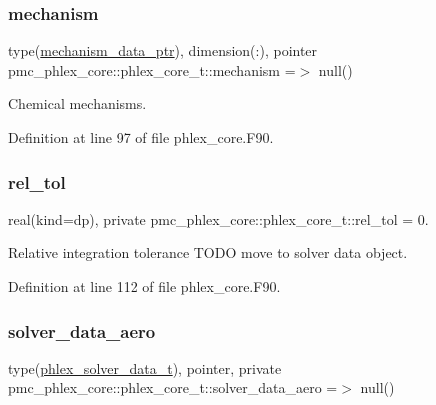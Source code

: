 \subsubsection{\texorpdfstring{mechanism}{mechanism}}
{\footnotesize\ttfamily type(\mbox{\hyperlink{structpmc__mechanism__data_1_1mechanism__data__ptr}{mechanism\+\_\+data\+\_\+ptr}}), dimension(\+:), pointer pmc\+\_\+phlex\+\_\+core\+::phlex\+\_\+core\+\_\+t\+::mechanism =$>$ null()\hspace{0.3cm}{\ttfamily [private]}}



Chemical mechanisms. 



Definition at line 97 of file phlex\+\_\+core.\+F90.

\mbox{\label{structpmc__phlex__core_1_1phlex__core__t_ad32a01219466ea95cf1db2633f017348}} 
\subsubsection{\texorpdfstring{rel\+\_\+tol}{rel\_tol}}
{\footnotesize\ttfamily real(kind=dp), private pmc\+\_\+phlex\+\_\+core\+::phlex\+\_\+core\+\_\+t\+::rel\+\_\+tol = 0.\hspace{0.3cm}{\ttfamily [private]}}



Relative integration tolerance T\+O\+DO move to solver data object. 



Definition at line 112 of file phlex\+\_\+core.\+F90.

\mbox{\label{structpmc__phlex__core_1_1phlex__core__t_a286ab62eaedfa66082c6817890ecb2f0}} 
\subsubsection{\texorpdfstring{solver\+\_\+data\+\_\+aero}{solver\_data\_aero}}
{\footnotesize\ttfamily type(\mbox{\hyperlink{structpmc__phlex__solver__data_1_1phlex__solver__data__t}{phlex\+\_\+solver\+\_\+data\+\_\+t}}), pointer, private pmc\+\_\+phlex\+\_\+core\+::phlex\+\_\+core\+\_\+t\+::solver\+\_\+data\+\_\+aero =$>$ null()\hspace{0.3cm}{\ttfamily [private]}}



